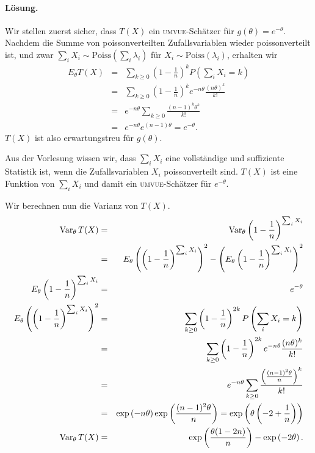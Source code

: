 \paragraph*{Lösung. } Wir stellen zuerst sicher, dass $T(X)$ ein \textsc{umvue}-Schätzer 
für $g(\theta)=e^{-\theta}$. Nachdem die Summe von poissonverteilten Zufallsvariablen
wieder poissonverteilt ist, und zwar 
$\sum_{i}^{} X_i \sim \textrm{Poiss}(\sum_{i}^{} \lambda_i)$ für 
$X_i \sim \textrm{Poiss}(\lambda_i)$, erhalten wir
\begin{eqnarray}
    E_\theta T(X) &=& \sum_{k\geq 0} \left( 1-\frac{1}{n} \right)^k P\left( \sum_{i}^{} X_i =k \right)\\
    &=& \sum_{k\geq 0}^{} \left( 1-\frac{1}{n} \right)^k e^{-n\theta} \frac{(n\theta)^k}{k!} \\
    &=& e^{-n\theta} \sum_{k\geq 0} \frac{ (n-1)^k\theta^k}{k!} \\
    &=& e^{-n \theta} e^{(n-1)\theta} = e^{-\theta}.
\end{eqnarray}
$T(X)$ ist also erwartungstreu für $g(\theta)$.

Aus der Vorlesung wissen wir, dass $\sum_{i}^{} X_i$ eine vollständige und suffiziente
Statistik ist, wenn die Zufallsvariablen $X_i$ poissonverteilt sind. $T(X)$ ist 
eine Funktion von $\sum_{i}^{} X_i$ und damit ein \textsc{umvue}-Schätzer
für $e^{-\theta}$.

Wir berechnen nun die Varianz von $T(X)$.
\begin{eqnarray}
    \operatorname{Var}_\theta T(X)&=& \operatorname{Var}_\theta \left( 1-\frac{1}{n} \right)^{\sum_{i} X_i} \\ 
    &=& E_\theta \left( \left( 1-\frac{1}{n} \right)^{\sum_{i} X_i} \right)^2 - \left( E_\theta \left( 1-\frac{1}{n} \right)^{\sum_{i} X_i} \right)^2 \\
    E_\theta \left( 1-\frac{1}{n} \right)^{\sum_{i} X_i} &=& e^{-\theta} \\
    E_\theta \left( \left( 1-\frac{1}{n} \right)^{\sum_{i} X_i} \right)^2 
    &=& \sum_{k\geq 0}^{} \left( 1-\frac{1}{n} \right)^{2k} P\left( \sum_{i}^{} X_i =k \right) \\
    &=& \sum_{k\geq 0}^{} \left( 1-\frac{1}{n} \right)^{2k} e^{-n\theta} \frac{(n\theta)^k}{k!} \\
    &=& e^{-n \theta} \sum_{k\geq 0} \frac{ \left( \frac{ (n-1)^2 \theta }{n} \right)^k   }{k!} \\
    &=& \exp\left( -n\theta \right) \exp\left( \frac{(n-1)^2\theta}{n} \right)
    = \exp\left( \theta\left( -2 + \frac{1}{n} \right) \right) \\
    \operatorname{Var}_\theta T(X) &=& \exp\left( \frac{\theta(1-2n)}{n} \right) - \exp\left( -2\theta \right). 
\end{eqnarray}

